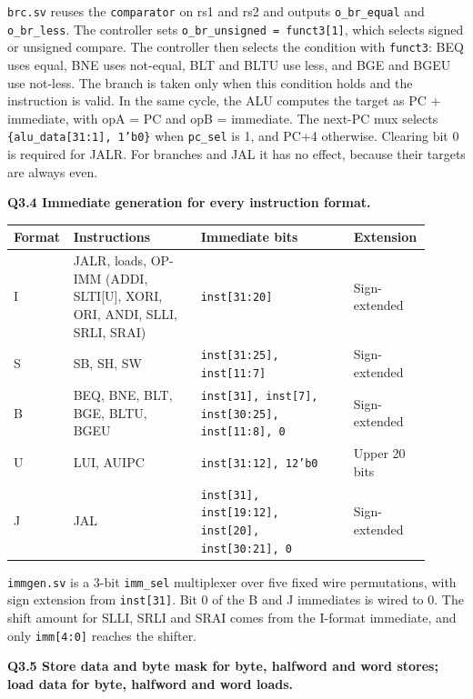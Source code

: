 \documentclass[10pt,a4paper]{article}
\newcommand{\code}[1]{\texttt{#1}}
\begin{document}
\code{brc.sv} reuses the \code{comparator} on rs1 and rs2 and outputs
\code{o\_br\_equal} and \code{o\_br\_less}. The controller sets
\code{o\_br\_unsigned = funct3[1]}, which selects signed or unsigned compare.
The controller then selects the condition with \code{funct3}: BEQ uses equal,
BNE uses not-equal, BLT and BLTU use less, and BGE and BGEU use not-less.
The branch is taken only when this condition holds and the instruction is
valid. In the same cycle, the ALU computes the target as PC + immediate, with
opA = PC and opB = immediate. The next-PC mux selects
\code{\{alu\_data[31:1], 1'b0\}} when \code{pc\_sel} is 1, and PC+4 otherwise.
Clearing bit 0 is required for JALR. For branches and JAL it has no effect,
because their targets are always even.

\textbf{Q3.4 Immediate generation for every instruction format.}

\begin{tabular}{@{}p{0.08\linewidth}p{0.30\linewidth}p{0.36\linewidth}p{0.17\linewidth}@{}}
\toprule
\textbf{Format} & \textbf{Instructions} & \textbf{Immediate bits} & \textbf{Extension} \\
\midrule
I & JALR, loads, OP-IMM (ADDI, SLTI[U], XORI, ORI, ANDI, SLLI, SRLI, SRAI) & \code{inst[31:20]} & Sign-extended \\
S & SB, SH, SW & \code{inst[31:25], inst[11:7]} & Sign-extended \\
B & BEQ, BNE, BLT, BGE, BLTU, BGEU & \code{inst[31], inst[7], inst[30:25], inst[11:8], 0} & Sign-extended \\
U & LUI, AUIPC & \code{inst[31:12], 12'b0} & Upper 20 bits \\
J & JAL & \code{inst[31], inst[19:12], inst[20], inst[30:21], 0} & Sign-extended \\
\bottomrule
\end{tabular}

\code{immgen.sv} is a 3-bit \code{imm\_sel} multiplexer over five fixed wire
permutations, with sign extension from \code{inst[31]}. Bit 0 of the B and J
immediates is wired to 0. The shift amount for SLLI, SRLI and SRAI comes from
the I-format immediate, and only \code{imm[4:0]} reaches the shifter.

\textbf{Q3.5 Store data and byte mask for byte, halfword and word
stores; load data for byte, halfword and word loads.}
\end{document}

